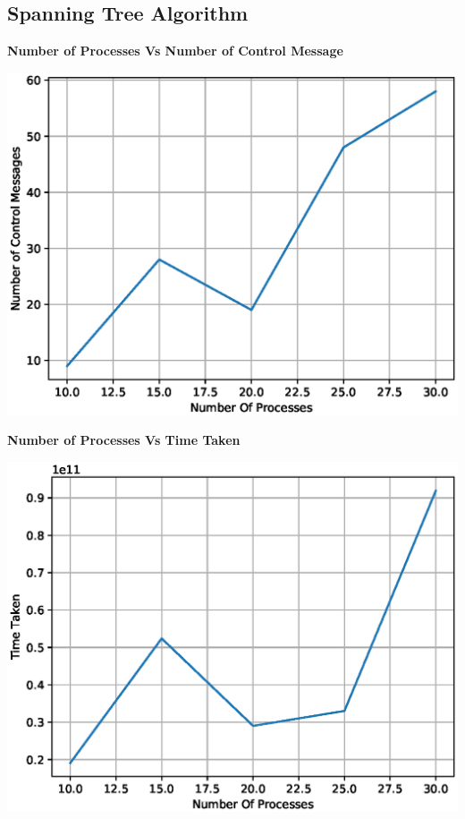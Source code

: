 \documentclass[a4paper,12pt]{report}
\begin{document}
\subsection{Spanning Tree Algorithm}
\begin{center}
\begin{large}
\textbf{Number of Processes Vs Number of Control Message}\\
\end{large}
\includegraphics[scale=0.7]{./ncm1.eps}
\end{center}
\begin{center}
\begin{large}
\textbf{Number of Processes Vs Time Taken}\\
\end{large}
\includegraphics[scale=0.7]{./tt1.eps}
\end{center}
\end{document}
